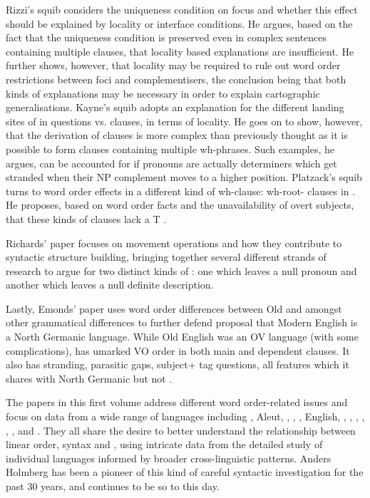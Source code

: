 \documentclass[output=paper]{langsci/langscibook}
\begin{document}
Rizzi’s squib considers the uniqueness condition on focus and whether this effect should be explained by locality or interface conditions. He argues, based on the fact that the uniqueness condition is preserved even in complex sentences containing multiple clauses, that locality based explanations are insufficient. He further shows, however, that locality may be required to rule out word order restrictions between foci and  complementisers, the conclusion being that both kinds of explanations may be necessary in order to explain cartographic generalisations. Kayne’s squib adopts an explanation for the different landing sites of  in questions vs.  clauses, in terms of locality. He goes on to show, however, that the derivation of  clauses is more complex than previously thought as it is possible to form  clauses containing multiple wh-phrases. Such examples, he argues, can be accounted for if  pronouns are actually determiners which get stranded when their NP complement moves to a higher position. Platzack’s squib turns to word order effects in a different kind of wh-clause: wh-root- clauses in . He proposes, based on word order facts and the unavailability of overt subjects, that these kinds of clauses lack a T . 

Richards’ paper focuses on movement operations and how they contribute to syntactic structure building, bringing together several different strands of research to argue for two distinct kinds of : one which leaves a null pronoun and another which leaves a null definite description. 

Lastly, Emonds’ paper uses word order differences between Old and  amongst other grammatical differences to further defend  proposal that Modern English is a North Germanic language. While Old English was an OV language (with some complications),  has umarked VO order in both main and dependent clauses. It also has  stranding, parasitic gaps, subject+ tag questions, all features which it shares with North Germanic but not . 

The papers in this first volume address different word order-related issues and focus on data from a wide range of languages including , Aleut, , , , English, , , , , , , and . They all share the desire to better understand the relationship between linear order, syntax and , using intricate data from the detailed study of individual languages informed by broader cross-linguistic patterns. Anders Holmberg has been a pioneer of this kind of careful syntactic investigation for the past 30 years, and continues to be so to this day. 

\printbibliography[heading=subbibliography,notkeyword=this]
\end{document}
